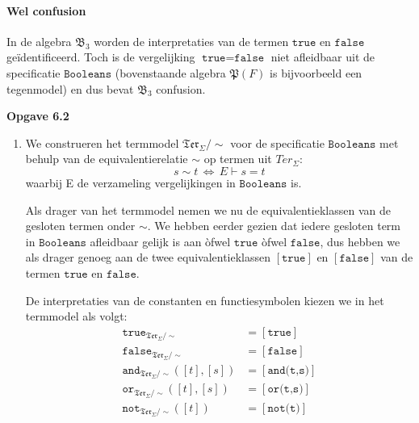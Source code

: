 \documentclass[a4paper,11pt]{article}
\begin{document}
\begin{enumerate}
\paragraph{Wel confusion}

In de algebra $\mathfrak{B}_{3}$ worden de interpretaties van de termen
$\texttt{true}$ en $\texttt{false}$ ge\"identificeerd. Toch is de vergelijking
$\texttt{true} = \texttt{false}$ niet afleidbaar uit de specificatie
$\texttt{Booleans}$ (bovenstaande algebra $\mathfrak{P}(F)$ is bijvoorbeeld
een tegenmodel) en dus bevat $\mathfrak{B}_{3}$ confusion.\\[2em]

\end{enumerate}


{\bf Opgave 6.2}

\begin{enumerate}

\item %

We construeren het termmodel $\mathfrak{Ter}_{\Sigma}/\sim$ voor de
specificatie $\texttt{Booleans}$ met behulp van de equivalentierelatie $\sim$
op termen uit $Ter_{\Sigma}$:
\begin{displaymath}
s \sim t \, \Longleftrightarrow \, E \vdash s = t
\end{displaymath}
waarbij E de verzameling vergelijkingen in $\texttt{Booleans}$ is.

Als drager van het termmodel nemen we nu de equivalentieklassen van de
gesloten termen onder $\sim$. We hebben eerder gezien dat iedere gesloten term
in $\texttt{Booleans}$ afleidbaar gelijk is aan \`ofwel $\texttt{true}$
\`ofwel $\texttt{false}$, dus hebben we als drager genoeg aan de twee
equivalentieklassen $[\texttt{true}]$ en $[\texttt{false}]$ van de termen
$\texttt{true}$ en $\texttt{false}$.

De interpretaties van de constanten en functiesymbolen kiezen we in het
termmodel als volgt:
\begin{align*}
\texttt{true}_{\mathfrak{Ter}_{\Sigma}/\sim}         &= [\texttt{true}] \\
\texttt{false}_{\mathfrak{Ter}_{\Sigma}/\sim}        &= [\texttt{false}] \\
\texttt{and}_{\mathfrak{Ter}_{\Sigma}/\sim}([t],[s]) &= [\texttt{and(t,s)}] \\
\texttt{or}_{\mathfrak{Ter}_{\Sigma}/\sim}([t],[s])  &= [\texttt{or(t,s)}] \\
\texttt{not}_{\mathfrak{Ter}_{\Sigma}/\sim}([t])     &= [\texttt{not(t)}] \\
\end{align*}


\end{enumerate}
\end{document}
